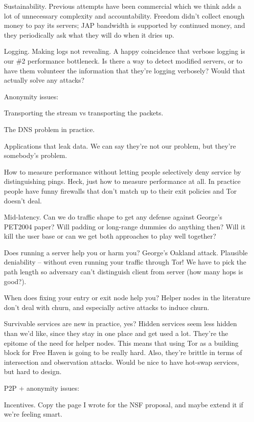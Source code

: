 \documentclass[twocolumn]{article}
\begin{document}
Sustainability. Previous attempts have been commercial which we think
adds a lot of unnecessary complexity and accountability. Freedom didn't
collect enough money to pay its servers; JAP bandwidth is supported by
continued money, and they periodically ask what they will do when it
dries up.

Logging. Making logs not revealing. A happy coincidence that verbose
logging is our \#2 performance bottleneck. Is there a way to detect
modified servers, or to have them volunteer the information that they're
logging verbosely? Would that actually solve any attacks?


Anonymity issues:

Transporting the stream vs transporting the packets.

The DNS problem in practice.

Applications that leak data. We can say they're not our problem, but
they're somebody's problem.

How to measure performance without letting people selectively deny service
by distinguishing pings. Heck, just how to measure performance at all. In
practice people have funny firewalls that don't match up to their exit
policies and Tor doesn't deal.

Mid-latency. Can we do traffic shape to get any defense against George's
PET2004 paper? Will padding or long-range dummies do anything then? Will
it kill the user base or can we get both approaches to play well together?

Does running a server help you or harm you? George's Oakland attack.
Plausible deniability -- without even running your traffic through Tor! We
have to pick the path length so adversary can't distinguish client from
server (how many hops is good?).

When does fixing your entry or exit node help you?
Helper nodes in the literature don't deal with churn, and
especially active attacks to induce churn.

Survivable services are new in practice, yes? Hidden services seem
less hidden than we'd like, since they stay in one place and get used
a lot. They're the epitome of the need for helper nodes. This means
that using Tor as a building block for Free Haven is going to be really
hard. Also, they're brittle in terms of intersection and observation
attacks. Would be nice to have hot-swap services, but hard to design.


P2P + anonymity issues:

Incentives. Copy the page I wrote for the NSF proposal, and maybe extend
it if we're feeling smart.
\end{document}
